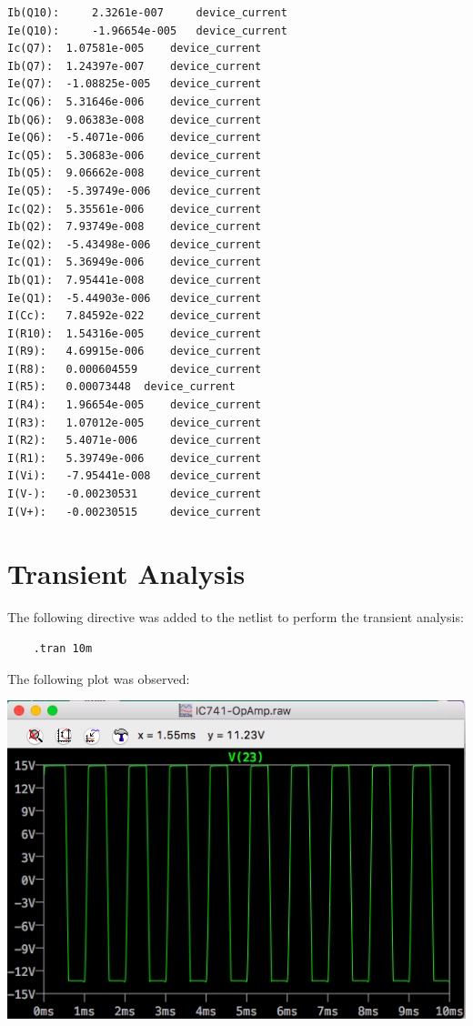 \documentclass[11pt]{article}
\begin{document}
\begin{verbatim}
Ib(Q10):	 2.3261e-007	 device_current
Ie(Q10):	 -1.96654e-005	 device_current
Ic(Q7):	 1.07581e-005	 device_current
Ib(Q7):	 1.24397e-007	 device_current
Ie(Q7):	 -1.08825e-005	 device_current
Ic(Q6):	 5.31646e-006	 device_current
Ib(Q6):	 9.06383e-008	 device_current
Ie(Q6):	 -5.4071e-006	 device_current
Ic(Q5):	 5.30683e-006	 device_current
Ib(Q5):	 9.06662e-008	 device_current
Ie(Q5):	 -5.39749e-006	 device_current
Ic(Q2):	 5.35561e-006	 device_current
Ib(Q2):	 7.93749e-008	 device_current
Ie(Q2):	 -5.43498e-006	 device_current
Ic(Q1):	 5.36949e-006	 device_current
Ib(Q1):	 7.95441e-008	 device_current
Ie(Q1):	 -5.44903e-006	 device_current
I(Cc):	 7.84592e-022	 device_current
I(R10):	 1.54316e-005	 device_current
I(R9):	 4.69915e-006	 device_current
I(R8):	 0.000604559	 device_current
I(R5):	 0.00073448	 device_current
I(R4):	 1.96654e-005	 device_current
I(R3):	 1.07012e-005	 device_current
I(R2):	 5.4071e-006	 device_current
I(R1):	 5.39749e-006	 device_current
I(Vi):	 -7.95441e-008	 device_current
I(V-):	 -0.00230531	 device_current
I(V+):	 -0.00230515	 device_current
\end{verbatim}
\newpage
\section{Transient Analysis}
The following directive was added to the netlist to perform the transient analysis:
\begin{verbatim}
    .tran 10m
\end{verbatim}
The following plot was observed:
\newline

\includegraphics[width=\textwidth]{Transient.png}
\end{document}
